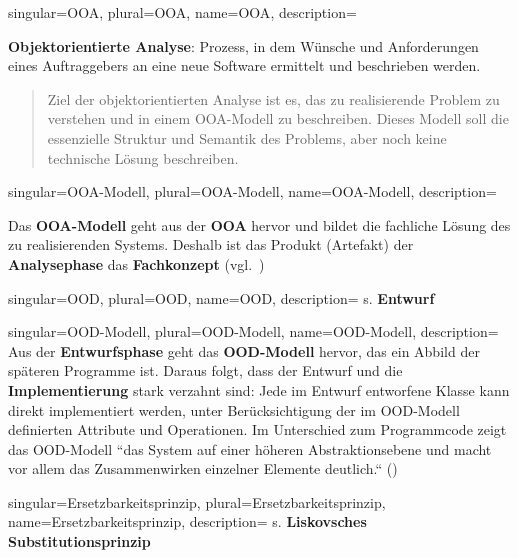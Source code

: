 {
singular={OOA},
plural={OOA},
name={OOA},
description={
\textbf{Objektorientierte Analyse}: Prozess, in dem Wünsche und Anforderungen eines Auftraggebers an eine neue Software ermittelt und beschrieben werden.\\
\blockquote[{\cite[10]{Bal05}}]{
Ziel der objektorientierten Analyse ist es, das zu realisierende Problem zu verstehen und in einem OOA-Modell zu beschreiben. Dieses Modell soll die essenzielle Struktur und Semantik des Problems, aber noch keine technische Lösung beschreiben.
}


}
}

{
singular={OOA-Modell},
plural={OOA-Modell},
name={OOA-Modell},
description={
Das \textbf{OOA-Modell} geht aus der \textbf{OOA} hervor und bildet die fachliche Lösung des zu realisierenden Systems.
Deshalb ist das Produkt (Artefakt) der \textbf{Analysephase} das \textbf{Fachkonzept} (vgl.~\cite[11]{Bal05})

}
}


{
singular={OOD},
plural={OOD},
name={OOD},
description={
s. \textbf{Entwurf}
}
}


{
singular={OOD-Modell},
plural={OOD-Modell},
name={OOD-Modell},
description={
Aus der \textbf{Entwurfsphase} geht das \textbf{OOD-Modell} hervor, das ein Abbild der späteren Programme ist. Daraus folgt, dass der Entwurf und die \textbf{Implementierung} stark verzahnt sind: Jede im Entwurf entworfene Klasse kann direkt implementiert werden, unter Berücksichtigung der im OOD-Modell definierten Attribute und Operationen. Im Unterschied zum Programmcode zeigt das OOD-Modell ``das System auf einer höheren Abstraktionsebene und macht vor allem das Zusammenwirken einzelner Elemente deutlich.`` (\cite[15]{Bal05})
}
}

{
singular={Ersetzbarkeitsprinzip},
plural={Ersetzbarkeitsprinzip},
name={Ersetzbarkeitsprinzip},
description={
s. \textbf{Liskovsches Substitutionsprinzip}
}
}



